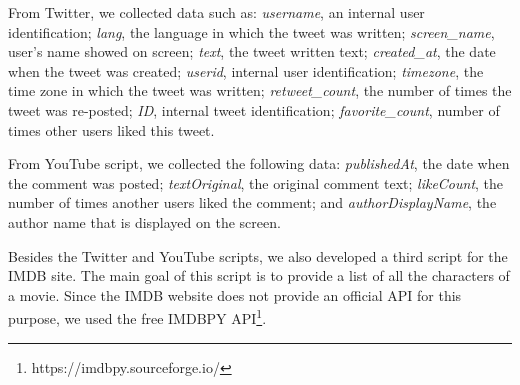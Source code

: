 From Twitter, we collected data such as: \textit{username}, an internal user identification; \textit{lang}, the language in which the tweet was written; \textit{screen\_name}, user's name showed on screen; \textit{text}, the tweet written text; \textit{created\_at}, the date when the tweet was created; \textit{userid}, internal user identification; \textit{timezone}, the time zone in which the tweet was written; \textit{retweet\_count}, the number of times the tweet was re-posted; \textit{ID}, internal tweet identification; \textit{favorite\_count}, number of times other users liked this tweet.

From YouTube script, we collected the following data: \textit{publishedAt}, the date when the comment was posted; \textit{textOriginal}, the original comment text; \textit{likeCount}, the number of times another users liked the comment; and \textit{authorDisplayName}, the author name that is displayed on the screen. 

Besides the Twitter and YouTube scripts, we also developed a third script for the IMDB site. The main goal of this script is to provide a list of all the characters of a movie. Since the IMDB website does not provide an official API for this purpose, we used the free IMDBPY API\footnote{https://imdbpy.sourceforge.io/}.



